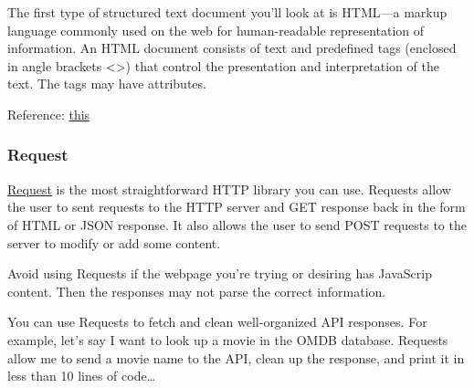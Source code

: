 \documentclass[11pt]{article}
\begin{document}
The first type of structured text document you'll look at is HTML---a
markup language commonly used on the web for human-readable
representation of information. An HTML document consists of text and
predefined tags (enclosed in angle brackets \textless\textgreater) that
control the presentation and interpretation of the text. The tags may
have attributes.

Reference:
\href{https://towardsdatascience.com/choose-the-best-python-web-scraping-library-for-your-application-91a68bc81c4f}{this}

    \hypertarget{request}{%
\subsubsection{Request}\label{request}}

\href{https://requests.readthedocs.io/en/master/}{Request} is the most
straightforward HTTP library you can use. Requests allow the user to
sent requests to the HTTP server and GET response back in the form of
HTML or JSON response. It also allows the user to send POST requests to
the server to modify or add some content.

    Avoid using Requests if the webpage you're trying or desiring has
JavaScrip content. Then the responses may not parse the correct
information.

You can use Requests to fetch and clean well-organized API responses.
For example, let's say I want to look up a movie in the OMDB database.
Requests allow me to send a movie name to the API, clean up the
response, and print it in less than 10 lines of code\ldots{}
\end{document}
